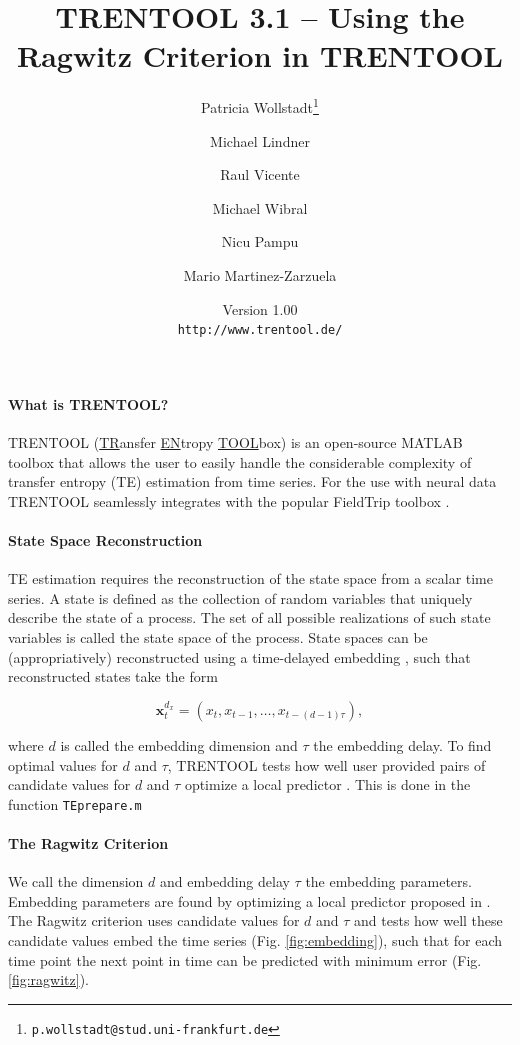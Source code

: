 \documentclass[a4paper,10pt]{article}
\begin{document}
\title{TRENTOOL 3.1 -- Using the Ragwitz Criterion in TRENTOOL}
\author{Patricia Wollstadt\thanks{\texttt{p.wollstadt@stud.uni-frankfurt.de}} \and Michael Lindner \and Raul Vicente \and Michael Wibral \and Nicu Pampu \and Mario Martinez-Zarzuela}
\date{Version 1.00\\ 
\texttt{http://www.trentool.de/}}

\maketitle


\paragraph*{What is TRENTOOL?} TRENTOOL (\underline{TR}ansfer \underline{EN}tropy \underline{TOOL}box) is an open-source MATLAB toolbox that allows the user to easily handle the considerable complexity of transfer entropy (TE) estimation from time series. For the use with neural data TRENTOOL seamlessly integrates with the popular FieldTrip toolbox \cite{oostenveld2011}. 

\paragraph*{State Space Reconstruction} TE estimation requires the reconstruction of the state space from a scalar time series. A state is defined as the collection of random variables that uniquely describe the state of a process. The set of all possible realizations of such state variables is called the state space of the process. State spaces can be (appropriatively) reconstructed using a time-delayed embedding \cite{takens1981}, such that reconstructed states take the form 

\[
    \mathbf{x}_t^{d_x} = \left(x_t, x_{t-1}, \ldots, x_{t-(d-1)\tau} \right),
\]

where $d$ is called the embedding dimension and $\tau$ the embedding delay. To find optimal values for $d$ and $\tau$, TRENTOOL tests how well user provided pairs of candidate values for $d$ and $\tau$ optimize a local predictor \cite{ragwitz2002}. This is done in the function \texttt{TEprepare.m}

\paragraph*{The Ragwitz Criterion} We call the dimension $d$ and embedding delay $\tau$ the embedding parameters. Embedding parameters are found by optimizing a local predictor proposed in \cite{ragwitz2002}. The Ragwitz criterion uses candidate values for $d$ and $\tau$ and tests how well these candidate values embed the time series (Fig. \ref{fig:embedding}), such that for each time point the next point in time can be predicted with minimum error (Fig. \ref{fig:ragwitz}).
\end{document}
